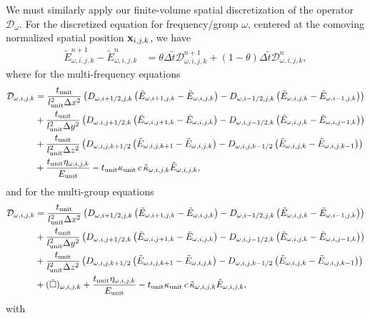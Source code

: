 \documentclass[10pt]{article}
\renewcommand{\(}{\left(}
\renewcommand{\)}{\right)}
\newcommand{\xvec}{{\bf x}}
\newcommand{\mD}{{\mathcal D}}
\newcommand{\Lunit}{l_{\text{unit}}}
\newcommand{\Tunit}{t_{\text{unit}}}
\newcommand{\Eunit}{E_{\text{unit}}}
\newcommand{\Kunit}{\kappa_{\text{unit}}}
\newcommand{\tK}{\tilde{\kappa}}
\newcommand{\tT}{\tilde{t}}
\newcommand{\tE}{\tilde{E}}
\begin{document}
We must similarly apply our finite-volume spatial discretization of
the operator $\mD_{\omega}$.  For the discretized equation for
frequency/group $\omega$, centered at the comoving normalized spatial
position $\xvec_{i,j,k}$, we have  
\begin{align}
  \label{eq:mgfld_discrete}
  \tE_{\omega,i,j,k}^{n+1} - \tE_{\omega,i,j,k}^n &= \theta\Delta \tT \mD_{\omega,i,j,k}^{n+1} 
    + (1-\theta)\Delta \tT \mD_{\omega,i,j,k}^{n},
\end{align}
where for the multi-frequency equations
\begin{align}
  \label{eq:discrete_multifrequency_operator}
  \mD_{\omega,i,j,k} &= 
       \frac{\Tunit}{\Lunit^2 \Delta x^2}\(D_{\omega,i+1/2,j,k}\(\tE_{\omega,i+1,j,k} - \tE_{\omega,i,j,k}\) - D_{\omega,i-1/2,j,k}\(\tE_{\omega,i,j,k} - \tE_{\omega,i-1,j,k}\)\) \\
 \notag
    &+ \frac{\Tunit}{\Lunit^2 \Delta y^2}\(D_{\omega,i,j+1/2,k}\(\tE_{\omega,i,j+1,k} - \tE_{\omega,i,j,k}\) - D_{\omega,i,j-1/2,k}\(\tE_{\omega,i,j,k} - \tE_{\omega,i,j-1,k}\)\) \\
  \notag
    &+ \frac{\Tunit}{\Lunit^2 \Delta z^2}\(D_{\omega,i,j,k+1/2}\(\tE_{\omega,i,j,k+1} - \tE_{\omega,i,j,k}\) - D_{\omega,i,j,k-1/2}\(\tE_{\omega,i,j,k} - \tE_{\omega,i,j,k-1}\)\) \\
  \notag
    &+ \frac{\Tunit \eta_{\omega,i,j,k}}{\Eunit} 
     - \Tunit \Kunit\, c\, \tK_{\omega,i,j,k} \tE_{\omega,i,j,k},
\end{align}
and for the multi-group equations
\begin{align}
  \label{eq:discrete_multigroup_operator}
  \mD_{\omega,i,j,k} &= 
       \frac{\Tunit}{\Lunit^2 \Delta x^2}\(D_{\omega,i+1/2,j,k}\(\tE_{\omega,i+1,j,k} - \tE_{\omega,i,j,k}\) - D_{\omega,i-1/2,j,k}\(\tE_{\omega,i,j,k} - \tE_{\omega,i-1,j,k}\)\) \\
 \notag
    &+ \frac{\Tunit}{\Lunit^2 \Delta y^2}\(D_{\omega,i,j+1/2,k}\(\tE_{\omega,i,j+1,k} - \tE_{\omega,i,j,k}\) - D_{\omega,i,j-1/2,k}\(\tE_{\omega,i,j,k} - \tE_{\omega,i,j-1,k}\)\) \\
  \notag
    &+ \frac{\Tunit}{\Lunit^2 \Delta z^2}\(D_{\omega,i,j,k+1/2}\(\tE_{\omega,i,j,k+1} - \tE_{\omega,i,j,k}\) - D_{\omega,i,j,k-1/2}\(\tE_{\omega,i,j,k} - \tE_{\omega,i,j,k-1}\)\) \\
  \notag
    &+ (\tilde{\square})_{\omega,i,j,k} + \frac{\Tunit \eta_{\omega,i,j,k}}{\Eunit} 
     - \Tunit \Kunit\, c\, \tK_{\omega,i,j,k} \tE_{\omega,i,j,k},
\end{align}
with
\end{document}
